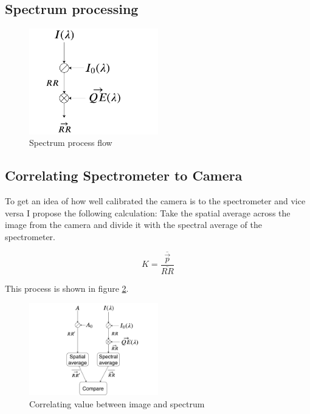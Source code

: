 \documentclass{article}
\newcommand*\mean[1]{\overline{#1}}
\begin{document}
\subsection{Spectrum processing}
\label{sec:spectrum_processing}

\begin{figure}[h]
    \centering
    \includegraphics[width=0.5\textwidth]{figures/thesis_program_flow.pdf}
    \caption{Spectrum process flow}
    \label{fig:spectrum_process_flow}
\end{figure}

\subsection{Correlating Spectrometer to Camera}
\label{sec:method_correlating_spectrum_to_camera}
To get an idea of how well calibrated the camera is to the spectrometer and vice versa I propose the following calculation: 
Take the spatial average across the image from the camera and divide it with the spectral average of the spectrometer. 

\begin{equation}
    \label{eq:correlating_spectrum_to_camera}
    K = \frac{\mean{\vec{p}}}{\mean{RR}}
\end{equation}

This process is shown in figure \ref{fig:correlating_spectrum_and_image}.

\begin{figure}[h]
    \centering
    \includegraphics[width=0.5\textwidth]{figures/image_comparison_with_spectrometer.pdf}
    \caption{Correlating value between image and spectrum}
    \label{fig:correlating_spectrum_and_image}
\end{figure}
\end{document}
